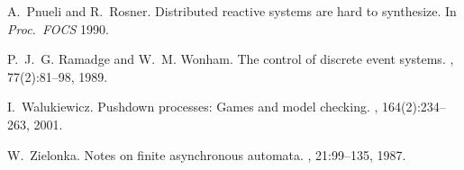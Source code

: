 \documentclass[10pt,a4paper]{article}
\begin{document}
\begin{thebibliography}{10}
A.~Pnueli and R.~Rosner.
\newblock Distributed reactive systems are hard to synthesize.
\newblock In {\em Proc.~FOCS} 1990.

P.~J.~G. Ramadge and W.~M. Wonham.
\newblock The control of discrete event systems.
, 77(2):81--98, 1989.

I.~Walukiewicz.
\newblock Pushdown processes: Games and model checking.
, 164(2):234--263, 2001.

W.~Zielonka.
\newblock Notes on finite asynchronous automata.
, 21:99--135,
  1987.

\end{thebibliography}

\newpage
\end{document}
